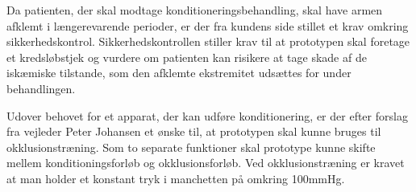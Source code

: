 Da patienten, der skal modtage konditioneringsbehandling, skal have armen afklemt i længerevarende perioder, er der fra kundens side stillet et krav omkring sikkerhedskontrol. Sikkerhedskontrollen stiller krav til at prototypen skal foretage et kredsløbstjek og vurdere om patienten kan risikere at tage skade af de iskæmiske tilstande, som den afklemte ekstremitet udsættes for under behandlingen.

Udover behovet for et apparat, der kan udføre konditionering, er der efter forslag fra vejleder Peter Johansen et ønske til, at prototypen skal kunne bruges til okklusionstræning. Som to separate funktioner skal prototype kunne skifte mellem konditioningsforløb og okklusionsforløb. Ved okklusionstræning er kravet at man holder et konstant tryk i manchetten på omkring 100mmHg. 


